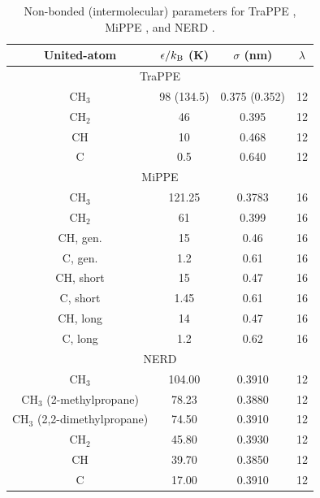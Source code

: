 \documentclass[journal=jced,manuscript=article]{achemso}
\begin{document}
    \begin{table}[h!]
		\caption{Non-bonded (intermolecular) parameters for TraPPE \cite{TraPPE,Martin1999}, MiPPE \cite{Mie,Potoff_branched}, and NERD \cite{NERD}.} \label{tab:nonbonded params}
		\begin{center}
			\begin{tabular}{|c|c|c|c|}
				\hline
				United-atom & $\epsilon/k_{\rm B}$ (K) & $\sigma$ (nm) & $\lambda$ \\ \hline
				\multicolumn{4}{|c|}{TraPPE} \\ \hline
				CH$_3$ & 98 (134.5)  & 0.375 (0.352) & 12 \\ 
				CH$_2$ & 46 & 0.395 & 12\\ 
				CH & 10 & 0.468 & 12 \\
				C & 0.5 & 0.640 & 12 \\
				\hline
				\multicolumn{4}{|c|}{MiPPE} \\ \hline
				CH$_3$ & 121.25 & 0.3783 & 16  \\ 
				CH$_2$ & 61 & 0.399 & 16 \\ 
				CH, gen. & 15 & 0.46 & 16\\
				C, gen. & 1.2 & 0.61 & 16\\
				CH, short & 15 & 0.47 & 16\\
				C, short & 1.45 & 0.61 & 16\\
				CH, long & 14 & 0.47 & 16\\
				C, long & 1.2 & 0.62 & 16\\
				\hline
                \multicolumn{4}{|c|}{NERD} \\ \hline
				CH$_3$ & 104.00  & 0.3910 & 12\\ 
				CH$_3$ (2-methylpropane) & 78.23  & 0.3880 & 12\\ 
				CH$_3$ (2,2-dimethylpropane) & 74.50  & 0.3910 & 12 \\  
				CH$_2$ & 45.80 & 0.3930 & 12 \\ 
				CH & 39.70 & 0.3850 & 12\\
				C & 17.00 & 0.3910 & 12 \\
				\hline
			\end{tabular}
		\end{center} 
	\end{table}
    
\end{document}
